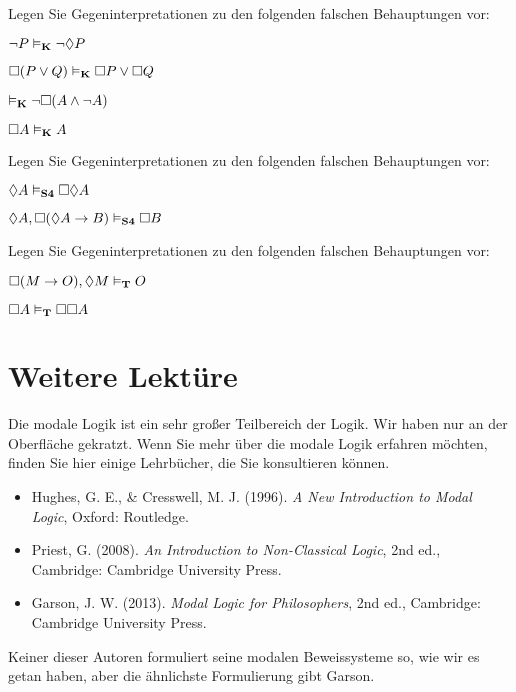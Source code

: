 \practiceproblems

\problempart
Legen Sie Gegeninterpretationen zu den folgenden falschen Behauptungen vor:
\begin{earg}
	\item $\neg P \vDash_{\mathbf{K}} \neg\Diamond P$
	\item $\Box(P \vee Q)\vDash_{\mathbf{K}} \Box P \vee \Box Q$
	\item $\vDash_{\mathbf{K}} \neg \Box (A\wedge \neg A)$
	\item $\Box A\vDash_{\mathbf{K}} A$
\end{earg}

\problempart
Legen Sie Gegeninterpretationen zu den folgenden falschen Behauptungen vor:
\begin{earg}
	\item $\Diamond A\vDash_{\mathbf{S4}} \Box\Diamond A$
	\item $\Diamond A, \Box (\Diamond A \rightarrow B)\vDash_{\mathbf{S4}}\Box B$
\end{earg}

\problempart
Legen Sie Gegeninterpretationen zu den folgenden falschen Behauptungen vor:
\begin{earg}
	\item $\Box (M\rightarrow O),\Diamond M\vDash_{\mathbf{T}} O$
	\item $\Box A\vDash_{\mathbf{T}} \Box \Box A$
\end{earg}

\section*{Weitere Lektüre}

Die modale Logik ist ein sehr gro{\ss}er Teilbereich der Logik. Wir haben nur an der Oberfläche gekratzt. Wenn Sie mehr über die modale Logik erfahren möchten, finden Sie hier einige Lehrbücher, die Sie konsultieren können.
\begin{itemize}
	\item Hughes, G. E., \& Cresswell, M. J. (1996). \emph{A New Introduction to Modal Logic}, Oxford: Routledge.
	\item Priest, G. (2008). \emph{An Introduction to Non-Classical Logic}, 2nd ed., Cambridge: Cambridge University Press.
	\item Garson, J. W. (2013). \emph{Modal Logic for Philosophers}, 2nd ed., Cambridge: Cambridge University Press.
\end{itemize}

Keiner dieser Autoren formuliert seine modalen Beweissysteme so, wie wir es getan haben, aber die ähnlichste Formulierung gibt Garson.